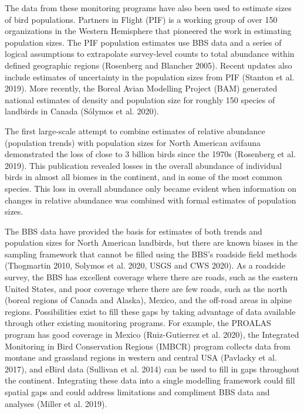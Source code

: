 \documentclass[]{article}
\begin{document}
The data from these monitoring programs have also been used to estimate sizes of bird populations. Partners in Flight (PIF) is a working group of over 150 organizations in the Western Hemisphere that pioneered the work in estimating population sizes. The PIF population estimates use BBS data and a series of logical assumptions to extrapolate survey-level counts to total abundance within defined geographic regions (Rosenberg and Blancher 2005). Recent updates also include estimates of uncertainty in the population sizes from PIF (Stanton et al. 2019). More recently, the Boreal Avian Modelling Project (BAM) generated national estimates of density and population size for roughly 150 species of landbirds in Canada (Sólymos et al. 2020). 

The first large-scale attempt to combine estimates of relative abundance (population trends) with population sizes for North American avifauna demonstrated the loss of close to 3 billion birds since the 1970s (Rosenberg et al. 2019). This publication revealed losses in the overall abundance of individual birds in almost all biomes in the continent, and in some of the most common species. This loss in overall abundance only became evident when information on changes in relative abundance was combined with formal estimates of population sizes.

The BBS data have provided the basis for estimates of both trends and population sizes for North American landbirds, but there are known biases in the sampling framework that cannot be filled using the BBS’s roadside field methods (Thogmartin 2010, Solymos et al. 2020, USGS and CWS 2020). As a roadside survey, the BBS has excellent coverage where there are roads, such as the eastern United States, and poor coverage where there are few roads, such as the north (boreal regions of Canada and Alaska), Mexico, and the off-road areas in alpine regions. Possibilities exist to fill these gaps by taking advantage of data available through other existing monitoring programs. For example, the PROALAS program has good coverage in Mexico (Ruiz-Gutierrez et al. 2020), the Integrated Monitoring in Bird Conservation Regions (IMBCR) program collects data from montane and grassland regions in western and central USA (Pavlacky et al. 2017), and eBird data (Sullivan et al. 2014) can be used to fill in gaps throughout the continent. Integrating these data into a single modelling framework could fill spatial gaps and could address limitations and compliment BBS data and analyses (Miller et al. 2019).
\end{document}
